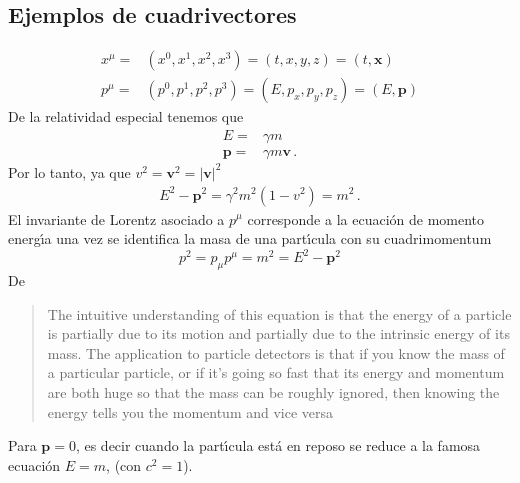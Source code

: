 \subsection{Ejemplos de cuadrivectores}
\begin{align}
    x^\mu=&(x^0,x^1,x^2,x^3)=(t,x,y,z)=(t,\mathbf{x})\\
  p^\mu=&(p^0,p^1,p^2,p^3)=(E,p_x,p_y,p_z)=(E,\mathbf{p})
\end{align}
De la relatividad especial tenemos que
\begin{align}
  E=&\gamma m \nonumber\\
  \mathbf{p}=&\gamma m\mathbf{v}\,.
\end{align}
Por lo tanto, ya que $v^2=\mathbf{v}^2=|\mathbf{v}|^2$
\begin{align}
  E^2-\mathbf{p}^2=\gamma^2m^2(1-v^2)=m^2\,.
\end{align}
El invariante de Lorentz asociado a $p^\mu$ corresponde a la ecuaci\'on de momento energ\'\i a una vez se identifica la masa de una part\'\i cula con su cuadrimomentum
\begin{equation}
  p^2=p_\mu p^\mu=m^2=E^2-\mathbf{p}^2
\end{equation}
De \cite{uslhcblog}
\begin{quote}
  The intuitive understanding of this equation is that the energy of a particle is partially due to its motion and partially due to the intrinsic energy of its mass.  The application to particle detectors is that if you know the mass of a particular particle, or if it’s going so fast that its energy and momentum are both huge so that the mass can be roughly ignored, then knowing the energy tells you the momentum and vice versa
\end{quote}

Para $\mathbf{p}=0$, es decir cuando la part\'\i cula est\'a en reposo se reduce a la famosa ecuaci\'on $E=m$, (con $c^2=1$).

